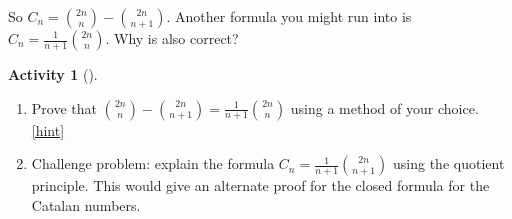 \documentclass[10pt,]{book}
\theoremstyle{plain}
\theoremstyle{definition}
\theoremstyle{definition}
\theoremstyle{definition}
\newtheorem{activity}[project]{Activity}
\numberwithin{equation}{chapter}
\begin{document}
\hypertarget{p-1035}{}%
So \(C_n = \binom{2n}{n} - \binom{2n}{n+1}\).  Another formula you might run into is \(C_n = \frac{1}{n+1}\binom{2n}{n}\).  Why is also correct?%
\begin{activity}[]\label{activity-176}
\leavevmode%
\begin{enumerate}[font=\bfseries,label=(\alph*),ref=\alph*]
\item\label{task-195} \hypertarget{p-1036}{}%
Prove that \(\binom{2n}{n} - \binom{2n}{n+1} = \frac{1}{n+1}\binom{2n}{n}\) using a method of your choice.%
\hfill{\tiny\hyperlink{a-183.a}{[hint]}\hypertarget{q-183.a}{}}\item\label{task-196} \hypertarget{p-1038}{}%
Challenge problem: explain the formula \(C_n = \frac{1}{n+1}\binom{2n}{n+1}\) using the quotient principle.  This would give an alternate proof for the closed formula for the Catalan numbers.%
\end{enumerate}
\end{activity}
\typeout{************************************************}
\typeout{************************************************}
\end{document}
